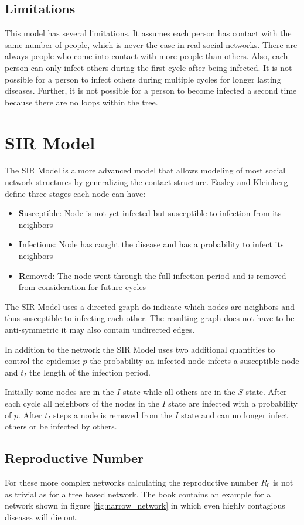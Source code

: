 \subsection{Limitations}
This model has several limitations. It assumes each person has contact with the same number of
people, which is never the case in real social networks. There are always people who come into
contact with more people than others. Also, each person can only infect others during the
first cycle after being infected. It is not possible for a person to infect others during multiple cycles for longer lasting diseases. Further, it is not possible for a person
to become infected a second time because there are no loops within the tree.

\section{SIR Model}
The SIR Model is a more advanced model that allows modeling of most social network structures
by generalizing the contact structure. Easley and Kleinberg \cite{networks} define three 
stages each node can have:
\begin{itemize}
    \item \textbf{S}usceptible: Node is not yet infected but susceptible to infection from its neighbors
    \item \textbf{I}nfectious: Node has caught the disease and has a probability to infect its neighbors
    \item \textbf{R}emoved: The node went through the full infection period and is removed from consideration for future cycles
\end{itemize}
The SIR Model uses a directed graph do indicate which nodes are neighbors and thus susceptible 
to infecting each other. The resulting graph does not have to be anti-symmetric it may also contain
undirected edges. 

In addition to the network the SIR Model uses two additional quantities to control the 
epidemic: $p$ the probability an infected node infects a susceptible node and $t_I$ the length
of the infection period.

Initially some nodes are in the $I$ state while all others are in the $S$ state. After
each cycle all neighbors of the nodes in the $I$ state are infected with a probability of $p$.
After $t_I$ steps a node is removed from the $I$ state and can no longer infect others or be
infected by others.

\subsection{Reproductive Number}
\label{sub:r0}
For these more complex networks calculating the reproductive number $R_0$ is not as trivial
as for a tree based network. The book contains an example for a network shown in figure \ref{fig:narrow_network}
in which even highly contagious diseases will die out.

